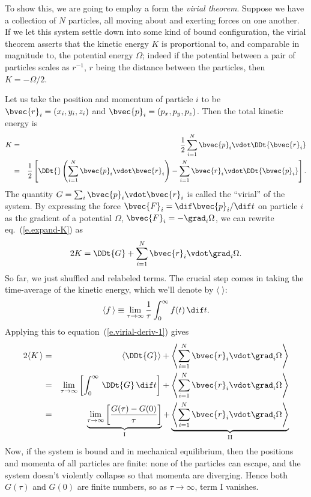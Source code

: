 To show this, we are going to employ a form the \emph{virial theorem}.  Suppose we have a collection of $N$ particles, all moving about and exerting forces on one another.  If we let this system settle down into some kind of bound configuration, the virial theorem asserts that the kinetic energy $K$ is proportional to, and comparable in magnitude to, the potential energy $\Omega$; indeed if the potential between a pair of particles scales as $r^{-1}$, $r$ being the distance between the particles, then $K = -\Omega/2$.

Let us take the position and momentum of particle $i$ to be $\bvec{r}_{i} = (x_{i},y_{i},z_{i})$ and $\bvec{p}_{i}=(p_{x},p_{y},p_{z})$.  Then the total kinetic energy is
\begin{eqnarray}
\nonumber
	K &=& \frac{1}{2}\sum_{i=1}^{N}\bvec{p}_{i}\vdot\DDt{\bvec{r}_{i}}\\
		&=& \frac{1}{2}\left[\DDt{}\left(\sum_{i=1}^{N}\bvec{p}_{i}\vdot\bvec{r}_{i}\right) - \sum_{i=1}^{N}\bvec{r}_{i}\vdot\DDt{\bvec{p}_{i}}\right].
\label{e.expand-K}
\end{eqnarray}
The quantity $G = \sum_{i}\bvec{p}_{i}\vdot\bvec{r}_{i}$ is called the ``virial'' of the system.  By expressing the force $\bvec{F}_{i} = \dif\bvec{p}_{i}/\dif t$ on particle $i$ as the gradient of a potential $\Omega$, $\bvec{F}_{i} = -\grad_{i}\Omega$, we can rewrite eq.~(\ref{e.expand-K}) as
\begin{equation}\label{e.virial-deriv-1}
	2K = \DDt{G} + \sum_{i=1}^{N}\bvec{r}_{i}\vdot\grad_{i}\Omega.
\end{equation}
So far, we just shuffled and relabeled terms.  The crucial step comes in taking the time-average of the kinetic energy, which we'll denote by $\langle\;\rangle$:
\[	\langle f\,\rangle \equiv \lim_{\tau\to\infty} \frac{1}{\tau}\int_{0}^{\infty}f(t)\,\dif t. \]
Applying this to equation~(\ref{e.virial-deriv-1}) gives
\begin{eqnarray*}
	2\langle K\,\rangle &=&
		 \left\langle\DDt{G}\right\rangle 
		+ \left\langle\sum_{i=1}^{N}\bvec{r}_{i}\vdot\grad_{i}\Omega\right\rangle\\
	&=& \lim_{\tau\to\infty}\left[\int_{0}^{\infty}\,\DDt{G}\,\dif t\right] 
		+ \left\langle\sum_{i=1}^{N}\bvec{r}_{i}\vdot\grad_{i}\Omega\right\rangle\\
	&=& \underbrace{\lim_{\tau\to\infty}\left[\frac{G(\tau)-G(0)}{\tau}\right]}_{\mathrm{I}}
		+ \underbrace{\left\langle\sum_{i=1}^{N}\bvec{r}_{i}\vdot\grad_{i}\Omega\right\rangle}_{\mathrm{II}}
\end{eqnarray*}
Now, if the system is bound and in mechanical equilibrium, then the positions and momenta of all particles are finite: none of the particles can escape, and the system doesn't violently collapse so that momenta are diverging.  Hence both $G(\tau)$ and $G(0)$ are finite numbers, so as $\tau\to\infty$, term I vanishes.

